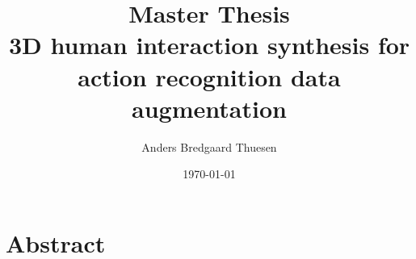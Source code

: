 \documentclass[options]{report}
\title{{\large Master Thesis} \\ 3D human interaction synthesis for action recognition data augmentation}
\author{Anders Bredgaard Thuesen}
\date{\today}
\begin{document}
\maketitle

\section*{Abstract}
\end{document}
